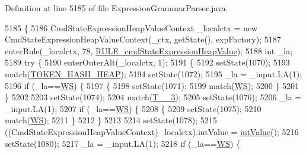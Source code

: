 Definition at line 5185 of file Expression\+Grammar\+Parser.\+java.


\begin{DoxyCode}
5185                                                                                                            
                                   \{
5186     CmdStateExpressionHeapValueContext \_localctx = \textcolor{keyword}{new} CmdStateExpressionHeapValueContext(\_ctx, getState(),
       expFactory);
5187     enterRule(\_localctx, 78, \hyperlink{classgov_1_1nasa_1_1jpf_1_1inspector_1_1server_1_1expression_1_1parser_1_1_expression_grammar_parser_ae4872c4266ee90116e292789ebb21a83}{RULE\_cmdStateExpressionHeapValue});
5188     \textcolor{keywordtype}{int} \_la;
5189     \textcolor{keywordflow}{try} \{
5190       enterOuterAlt(\_localctx, 1);
5191       \{
5192       setState(1070);
5193       match(\hyperlink{classgov_1_1nasa_1_1jpf_1_1inspector_1_1server_1_1expression_1_1parser_1_1_expression_grammar_parser_a1da7bb4fec606d687fcf52dfb99fd2f2}{TOKEN\_HASH\_HEAP});
5194       setState(1072);
5195       \_la = \_input.LA(1);
5196       \textcolor{keywordflow}{if} (\_la==\hyperlink{classgov_1_1nasa_1_1jpf_1_1inspector_1_1server_1_1expression_1_1parser_1_1_expression_grammar_parser_ace44714ae633c7b14794cc5a24d9ebf3}{WS}) \{
5197         \{
5198         setState(1071);
5199         match(\hyperlink{classgov_1_1nasa_1_1jpf_1_1inspector_1_1server_1_1expression_1_1parser_1_1_expression_grammar_parser_ace44714ae633c7b14794cc5a24d9ebf3}{WS});
5200         \}
5201       \}
5202 
5203       setState(1074);
5204       match(\hyperlink{classgov_1_1nasa_1_1jpf_1_1inspector_1_1server_1_1expression_1_1parser_1_1_expression_grammar_parser_a68f9589dcc3fc777455467ff010385ea}{T\_\_3});
5205       setState(1076);
5206       \_la = \_input.LA(1);
5207       \textcolor{keywordflow}{if} (\_la==\hyperlink{classgov_1_1nasa_1_1jpf_1_1inspector_1_1server_1_1expression_1_1parser_1_1_expression_grammar_parser_ace44714ae633c7b14794cc5a24d9ebf3}{WS}) \{
5208         \{
5209         setState(1075);
5210         match(\hyperlink{classgov_1_1nasa_1_1jpf_1_1inspector_1_1server_1_1expression_1_1parser_1_1_expression_grammar_parser_ace44714ae633c7b14794cc5a24d9ebf3}{WS});
5211         \}
5212       \}
5213 
5214       setState(1078);
5215       ((CmdStateExpressionHeapValueContext)\_localctx).intValue = \hyperlink{classgov_1_1nasa_1_1jpf_1_1inspector_1_1server_1_1expression_1_1parser_1_1_expression_grammar_parser_a8c7e4b657a12e07efe3ea6429cb9cdcf}{intValue}();
5216       setState(1080);
5217       \_la = \_input.LA(1);
5218       \textcolor{keywordflow}{if} (\_la==\hyperlink{classgov_1_1nasa_1_1jpf_1_1inspector_1_1server_1_1expression_1_1parser_1_1_expression_grammar_parser_ace44714ae633c7b14794cc5a24d9ebf3}{WS}) \{

\end{DoxyCode}
